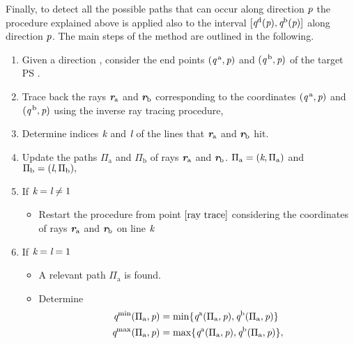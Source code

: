 Finally, to detect all the possible paths that can occur along direction $\textit{p}$ the procedure explained above is applied also to the interval $[\textit{q}^{\textrm{d}}(\textit{p}), \textit{q}^{\textrm{b}}(\textit{p})]$ along direction $\textit{p}$. 
The main steps of the method are outlined in the following.
\begin{enumerate}
\item Given a direction , consider the end points $(\textit{q}^{\,\textrm{a}}, \textit{p})$ and $(\textit{q}^{\,\textrm{b}}, \textit{p})$ of the target PS .
\item \label{ray trace} Trace back the rays $\textit{\textbf{r}}_{\textrm{a}}$ and $\textit{\textbf{r}}_\textrm{b}$ corresponding to the coordinates  $(\textit{q}^{\,\textrm{a}}, \textit{p})$ and $ (\textit{q}^{\,\textrm{b}}, \textit{p})$ using the inverse ray tracing procedure,
\item Determine indices $\textit{k}$ and $\textit{l}$ of the lines that  $\textit{\textbf{r}}_{\textrm{a}}$ and $\textit{\textbf{r}}_{\textrm{b}}$  hit.\\
\item Update the paths $\Pi_\textrm{a}$ and $\Pi_\textrm{b}$ of rays $\textit{\textbf{r}}_\textrm{a}$ and $\textit{\textbf{r}}_\textrm{b}$.  $\Pi_\textrm{a} = (\textit{k}, \Pi_{\textrm{a}})$ and $\Pi_\textrm{b} = (\textit{l}, \Pi_\textrm{b}),$
\item If $\textit{k}=\textit{l} \neq 1$ 
\begin{itemize}
\item Restart the procedure from point $\ref{ray trace}$ considering the coordinates of rays $\textit{\textbf{r}}_{\textrm{a}}$ and $\textit{\textbf{r}}_{\textrm{b}}$ on line $\textit{k}$ 
\end{itemize}
\item If $\textit{k}=\textit{l}= 1$ 
\begin{itemize}
\item A relevant path $\Pi_{\textrm{a}}$ is found. 
\item Determine 
\begin{equation*}
\begin{aligned}
\variabile{q}^{\textrm{min}}(\Pi_{\textrm{a}}, \variabile{p})&=\min\{\variabile{q}^{\textrm{a}}(\Pi_{\textrm{a}}, \variabile{p}), \variabile{q}^{\textrm{b}}(\Pi_{\textrm{a}}, \variabile{p})\}\\ 
\variabile{q}^{\textrm{max}}(\Pi_{\textrm{a}}, \variabile{p})&=\max\{\variabile{q}^{\textrm{a}}(\Pi_{\textrm{a}}, \variabile{p}), \variabile{q}^{\textrm{b}}(\Pi_{\textrm{a}}, \variabile{p})\},

\end{aligned}
\end{equation*}
\end{itemize}
\end{enumerate}
